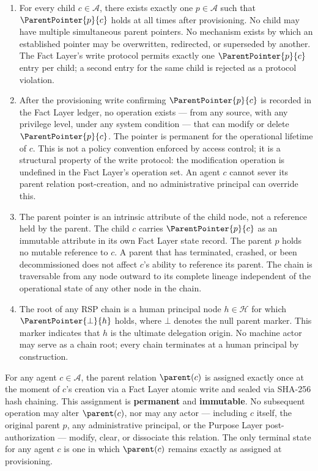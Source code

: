 \begin{enumerate}
    \item[(P1) \textbf{Uniqueness}] For every child $c \in \mathcal{A}$, there exists exactly one $p \in \mathcal{A}$ such that $\ParentPointer{p}{c}$ holds at all times after provisioning. No child may have multiple simultaneous parent pointers. No mechanism exists by which an established pointer may be overwritten, redirected, or superseded by another. The Fact Layer's write protocol permits exactly one $\ParentPointer{p}{c}$ entry per child; a second entry for the same child is rejected as a protocol violation.

    \item[(P2) \textbf{Immutability after assignment}] After the provisioning write confirming $\ParentPointer{p}{c}$ is recorded in the Fact Layer ledger, no operation exists --- from any source, with any privilege level, under any system condition --- that can modify or delete $\ParentPointer{p}{c}$. The pointer is permanent for the operational lifetime of $c$. This is not a policy convention enforced by access control; it is a structural property of the write protocol: the modification operation is undefined in the Fact Layer's operation set. An agent $c$ cannot sever its parent relation post-creation, and no administrative principal can override this.

    \item[(P3) \textbf{Directionality}] The parent pointer is an intrinsic attribute of the child node, not a reference held by the parent. The child $c$ carries $\ParentPointer{p}{c}$ as an immutable attribute in its own Fact Layer state record. The parent $p$ holds no mutable reference to $c$. A parent that has terminated, crashed, or been decommissioned does not affect $c$'s ability to reference its parent. The chain is traversable from any node outward to its complete lineage independent of the operational state of any other node in the chain.

    \item[(P4) \textbf{Human Anchor Termination}] The root of any RSP chain is a human principal node $h \in \mathcal{H}$ for which $\ParentPointer{\bot}{h}$ holds, where $\bot$ denotes the null parent marker. This marker indicates that $h$ is the ultimate delegation origin. No machine actor may serve as a chain root; every chain terminates at a human principal by construction.
\end{enumerate}

\begin{invariant}
\label{inv:pp_immutability}
For any agent $c \in \mathcal{A}$, the parent relation $\parent(c)$ is assigned exactly once at the moment of $c$'s creation via a Fact Layer atomic write and sealed via SHA-256 hash chaining. This assignment is \textbf{permanent} and \textbf{immutable}. No subsequent operation may alter $\parent(c)$, nor may any actor --- including $c$ itself, the original parent $p$, any administrative principal, or the Purpose Layer post-authorization --- modify, clear, or dissociate this relation. The only terminal state for any agent $c$ is one in which $\parent(c)$ remains exactly as assigned at provisioning.
\end{invariant}

